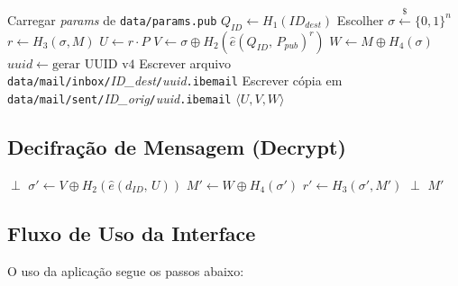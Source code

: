 \begin{algorithm}[H]
\caption{IBE Mail -- Encrypt}
\begin{algorithmic}[1]
  \State Carregar \textit{params} de \texttt{data/params.pub}
  \State $Q_{\mathit{ID}} \leftarrow H_1(\mathit{ID}_{\mathit{dest}})$
  \State Escolher $\sigma \xleftarrow{\$} \{0,1\}^n$
  \State $r \leftarrow H_3(\sigma, M)$
  \State $U \leftarrow r \cdot P$
  \State $V \leftarrow \sigma \oplus H_2\!\left(\hat{e}(Q_{\mathit{ID}},\, P_{\mathit{pub}})^r\right)$
  \State $W \leftarrow M \oplus H_4(\sigma)$
  \State $\mathit{uuid} \leftarrow \text{gerar UUID v4}$
  \State Escrever arquivo \texttt{data/mail/inbox/}\textit{ID\_dest}\texttt{/}\textit{uuid}\texttt{.ibemail}
  \State Escrever cópia em \texttt{data/mail/sent/}\textit{ID\_orig}\texttt{/}\textit{uuid}\texttt{.ibemail}
  \Return $\langle U, V, W \rangle$
\EndProcedure
\end{algorithmic}
\end{algorithm}

\subsection{Decifração de Mensagem (Decrypt)}

\begin{algorithm}[H]
\caption{IBE Mail -- Decrypt}
\begin{algorithmic}[1]
    \Return $\perp$ 
  \EndIf
  \State $\sigma' \leftarrow V \oplus H_2(\hat{e}(d_{\mathit{ID}},\, U))$
  \State $M' \leftarrow W \oplus H_4(\sigma')$
  \State $r' \leftarrow H_3(\sigma', M')$
    \Return $\perp$ 
  \EndIf
  \Return $M'$
\EndProcedure
\end{algorithmic}
\end{algorithm}

\subsection{Fluxo de Uso da Interface}

O uso da aplicação segue os passos abaixo:

